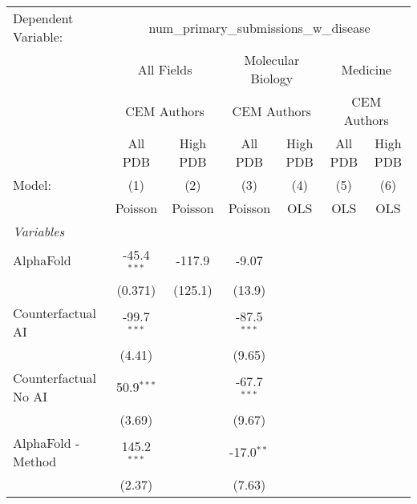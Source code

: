 \begingroup
\centering
\begin{tabular}{lcccccc}
   \tabularnewline \midrule \midrule
   Dependent Variable: & \multicolumn{6}{c}{num\_primary\_submissions\_w\_disease}\\
 & \multicolumn{2}{c}{All Fields} & \multicolumn{2}{c}{Molecular Biology} & \multicolumn{2}{c}{Medicine} \\
\cmidrule(lr){2-3} \cmidrule(lr){4-5} \cmidrule(lr){6-7}
 & \multicolumn{2}{c}{CEM Authors} & \multicolumn{2}{c}{CEM Authors} & \multicolumn{2}{c}{CEM Authors} \\
\cmidrule(lr){2-3} \cmidrule(lr){4-5} \cmidrule(lr){6-7}
 & \multicolumn{1}{c}{All PDB} & \multicolumn{1}{c}{High PDB} & \multicolumn{1}{c}{All PDB} & \multicolumn{1}{c}{High PDB} & \multicolumn{1}{c}{All PDB} & \multicolumn{1}{c}{High PDB} \\
\cmidrule(lr){2-2} \cmidrule(lr){3-3} \cmidrule(lr){4-4} \cmidrule(lr){5-5} \cmidrule(lr){6-6} \cmidrule(lr){7-7}
   Model:                                                     & (1)            & (2)     & (3)           & (4)  & (5)  & (6)\\  
                                                              &  Poisson       & Poisson & Poisson       & OLS  & OLS  & OLS\\  
   \midrule
   \emph{Variables}\\
   AlphaFold                                                  & -45.4$^{***}$  & -117.9  & -9.07         &      &      &   \\   
                                                              & (0.371)        & (125.1) & (13.9)        &      &      &   \\   
   Counterfactual AI                                          & -99.7$^{***}$  &         & -87.5$^{***}$ &      &      &   \\   
                                                              & (4.41)         &         & (9.65)        &      &      &   \\   
   Counterfactual No AI                                       & 50.9$^{***}$   &         & -67.7$^{***}$ &      &      &   \\   
                                                              & (3.69)         &         & (9.67)        &      &      &   \\   
   AlphaFold - Method                                         & 145.2$^{***}$  &         & -17.0$^{**}$  &      &      &   \\   
                                                              & (2.37)         &         & (7.63)        &      &      &   \\   

\end{tabular}
